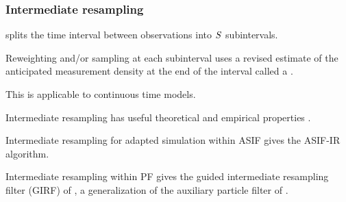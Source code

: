 \documentclass{beamer}
\begin{document}
\begin{frame}
\frametitle{Intermediate resampling}



\begin{myitemize}
\item {} splits the time interval between observations into $S$ subintervals.

\vspace{2mm}

\item Reweighting and/or sampling at each subinterval uses a revised estimate of the anticipated measurement density at the end of the interval called a .

\vspace{2mm}

\item This is applicable to continuous time models.

\vspace{2mm}

\item Intermediate resampling has useful theoretical and empirical properties \citep{delmoral15,park19}.

\vspace{2mm}

\item Intermediate resampling for adapted simulation within ASIF gives the ASIF-IR algorithm.

\vspace{2mm}

\item Intermediate resampling within PF gives the guided intermediate resampling filter (GIRF) of \citet{park19}, a generalization of the auxiliary particle filter of \citet{pitt99}.
  
\end{myitemize}

\end{frame}
\end{document}
